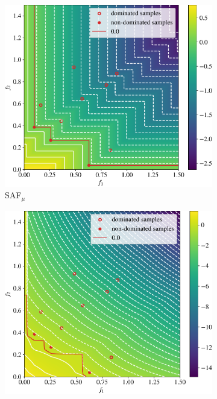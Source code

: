 \documentclass[conference]{IEEEtran}
\newcommand\safmu{SAF$_{\mu}$\xspace}
\begin{document}
\begin{figure}[t]
\begin{subfigure}[t]{0.48\columnwidth}
    \includegraphics[width=\columnwidth]{figures/_objective_space_SAF_mu.pdf}
    \caption{\safmu}
    \label{fig: saf_obj_space}
\end{subfigure}
\begin{subfigure}[t]{0.48\columnwidth}
    \includegraphics[width=\columnwidth]{figures/_objective_space_SMSEGO.pdf}

\end{subfigure}
\end{figure}
\end{document}
